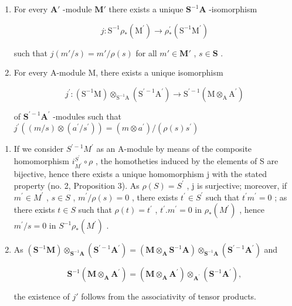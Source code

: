 \begin{enumerate}
\def\labelenumi{(\roman{enumi})}
\tightlist
\item
  For every \(\mathbf{A}'\) -module \(\mathbf{M}'\) there exists a unique \(\mathbf{S}^{-1}\mathbf{A}\) -isomorphism

\[
j \colon \mathrm{S} ^ {- 1} \rho_ {*} (\mathrm{M} ^ {\prime}) \rightarrow \rho_ {*} ^ {\prime} (\mathrm{S} ^ {- 1} \mathrm{M} ^ {\prime})
\]

such that \(j(m' / s) = m' / \rho(s)\) for all \(m' \in \mathbf{M}'\) , \(s \in \mathbf{S}\) .

\item
  For every A-module M, there exists a unique isomorphism

\[
j ^ {\prime} \colon (\mathrm{S} ^ {- 1} \mathrm{M}) \otimes_ {\mathrm{S} ^ {- 1} \mathrm{A}} (\mathrm{S} ^ {\prime - 1} \mathrm{A} ^ {\prime}) \rightarrow \mathrm{S} ^ {\prime - 1} (\mathrm{M} \otimes_ {\mathrm{A}} \mathrm{A} ^ {\prime})
\]

of \(\mathbf{S}^{\prime -1}\mathbf{A}^{\prime}\) -modules such that \(j^{\prime}((m / s)\otimes (a^{\prime} / s^{\prime})) = (m\otimes a^{\prime}) / (\rho (s)s^{\prime})\)

\end{enumerate}
\begin{enumerate}
\def\labelenumi{(\roman{enumi})}
\item
  If we consider \(S^{\prime-1}M^{\prime}\) as an A-module by means of the composite homomorphism \(i_{M^{\prime}}^{S^{\prime}}\circ\rho\) , the homotheties induced by the elements of S are bijective, hence there exists a unique homomorphism j with the stated property (no. 2, Proposition 3). As \(\rho(S)=S^{\prime}\) , j is surjective; moreover, if \(m^{\prime}\in M^{\prime}\) , \(s\in S\) , \(m^{\prime}/\rho(s)=0\) , there exists \(t^{\prime}\in S^{\prime}\) such that \(t^{\prime}m^{\prime}=0\) ; as there exists \(t\in S\) such that \(\rho(t)=t^{\prime}\) , \(t^{\prime}.m^{\prime}=0\) in \(\rho_{*}(M^{\prime})\) , hence \(m^{\prime}/s=0\) in \(S^{-1}\rho_{*}(M^{\prime})\) .
\item
  As \((\mathbf{S}^{-1}\mathbf{M})\otimes_{\mathbf{S}^{-1}\mathbf{A}}(\mathbf{S}^{\prime -1}\mathbf{A}^{\prime}) = (\mathbf{M}\otimes_{\mathbf{A}}\mathbf{S}^{-1}\mathbf{A})\otimes_{\mathbf{S}^{-1}\mathbf{A}}(\mathbf{S}^{\prime -1}\mathbf{A}^{\prime})\) and

\[
\mathbf {S} ^ {- 1} (\mathbf {M} \otimes_ {\mathbf {A}} \mathbf {A} ^ {\prime}) = (\mathbf {M} \otimes_ {\mathbf {A}} \mathbf {A} ^ {\prime}) \otimes_ {\mathbf {A} ^ {\prime}} (\mathbf {S} ^ {- 1} \mathbf {A} ^ {\prime}),
\]

the existence of \(j'\) follows from the associativity of tensor products.

\end{enumerate}
